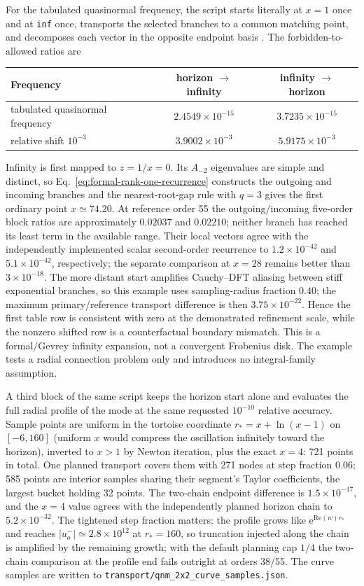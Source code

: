 \documentclass[11pt]{article}
\begin{document}
For the tabulated quasinormal frequency, the script starts literally at $x=1$ once and at
\texttt{inf} once, transports the selected branches to a common matching point, and
decomposes each vector in the opposite endpoint basis
\cite{Leaver:1985ax,Berti:2009kk}.  The forbidden-to-allowed ratios are
\begin{center}
\begin{tabular}{lcc}
\toprule
Frequency & horizon $\to$ infinity & infinity $\to$ horizon\\
\midrule
tabulated quasinormal frequency & $2.4549\times10^{-15}$ & $3.7235\times10^{-15}$\\
relative shift $10^{-3}$ & $3.9002\times10^{-3}$ & $5.9175\times10^{-3}$\\
\bottomrule
\end{tabular}
\end{center}
Infinity is first mapped to $z=1/x=0$.  Its $A_{-2}$ eigenvalues are simple and distinct, so
Eq.~\eqref{eq:formal-rank-one-recurrence} constructs the outgoing and incoming branches and
the nearest-root-gap rule with $q=3$ gives the first ordinary point $x\simeq74.20$.  At
reference order 55 the outgoing/incoming five-order block ratios are approximately
$0.02037$ and $0.02210$; neither branch has reached its least term in the available range.
Their local vectors agree with the independently implemented scalar second-order recurrence
to $1.2\times10^{-42}$ and $5.1\times10^{-42}$, respectively; the separate comparison at
$x=28$ remains better than $3\times10^{-18}$.  The more distant start amplifies Cauchy--DFT
aliasing between stiff exponential branches, so this example uses sampling-radius fraction
$0.40$; the maximum primary/reference transport difference is then $3.75\times10^{-22}$.
Hence the first table row is consistent with zero at the demonstrated
refinement scale, while the nonzero shifted row is a counterfactual boundary mismatch.  This
is a formal/Gevrey infinity expansion, not a convergent Frobenius disk.  The example tests a
radial connection problem only and introduces no integral-family assumption.

A third block of the same script keeps the horizon start alone and evaluates the full
radial profile of the mode at the same requested $10^{-10}$ relative accuracy.  Sample
points are uniform in the tortoise coordinate $r_\ast=x+\ln(x-1)$ on $[-6,160]$ (uniform
$x$ would compress the oscillation infinitely toward the horizon), inverted to $x>1$ by
Newton iteration, plus the exact $x=4$: 721 points in total.  One planned transport
covers them with 271 nodes at step fraction $0.06$; 585 points are interior samples
sharing their segment's Taylor coefficients, the largest bucket holding 32 points.  The
two-chain endpoint difference is $1.5\times10^{-17}$, and the $x=4$ value agrees with the
independently planned horizon chain to $5.2\times10^{-32}$.  The tightened step fraction
matters: the profile grows like $\mathrm{e}^{\mathrm{Re}(w)r_\ast}$ and reaches
$|u^-_o|\simeq2.8\times10^{12}$ at $r_\ast=160$, so truncation injected along the chain is
amplified by the remaining growth; with the default planning cap $1/4$ the two-chain
comparison at the profile end fails outright at orders 38/55.  The curve samples are
written to \texttt{transport/qnm\_2x2\_curve\_samples.json}.
\end{document}
